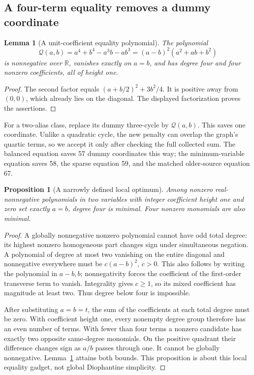 \documentclass[11pt,letterpaper]{article}
\newtheorem{lemma}[theorem]{Lemma}
\newtheorem{proposition}[theorem]{Proposition}
\theoremstyle{definition}\newtheorem{definition}[theorem]{Definition}
\theoremstyle{remark}\newtheorem{remark}[theorem]{Remark}
\newcommand{\Qeq}{\mathcal Q}
\begin{document}
\subsection{A four-term equality removes a dummy coordinate}

\begin{lemma}[A unit-coefficient equality polynomial]\label{lem:quarticpair}
The polynomial
\[
 \boxed{\Qeq(a,b)=a^4+b^4-a^3b-ab^3
             =(a-b)^2(a^2+ab+b^2)}
\]
is nonnegative over \(\mathbb R\), vanishes exactly on \(a=b\), and
has degree four and four nonzero coefficients, all of height one.
\end{lemma}
\begin{proof}
The second factor equals \((a+b/2)^2+3b^2/4\). It is positive away
from \((0,0)\), which already lies on the diagonal. The displayed
factorization proves the assertions.
\end{proof}

For a two-alias class, replace its dummy three-cycle by \(\Qeq(a,b)\).
This saves one coordinate. Unlike a quadratic cycle, the new penalty
can overlap the graph's quartic terms, so we accept it only after checking
the full collected sum. The balanced equation saves 57 dummy coordinates
this way; the minimum-variable equation saves 58, the sparse equation 59,
and the matched older-source equation 67.

\begin{proposition}[A narrowly defined local optimum]
Among nonzero real-nonnegative polynomials in two variables with integer
coefficient height one and zero set exactly \(a=b\), degree four is
minimal. Four nonzero monomials are also minimal.
\end{proposition}
\begin{proof}
A globally nonnegative nonzero polynomial cannot have odd total degree:
its highest nonzero homogeneous part changes sign under simultaneous
negation. A polynomial of degree at most two vanishing on the entire
diagonal and nonnegative everywhere must be \(c(a-b)^2\), \(c>0\).
This also follows by writing the polynomial in \(a-b,b\); nonnegativity
forces the coefficient of the first-order transverse term to vanish.
Integrality gives \(c\ge1\), so its mixed coefficient has magnitude at
least two. Thus degree below four is impossible.

After substituting \(a=b=t\), the sum of the coefficients at each
total degree must be zero. With coefficient height one, every nonempty
degree group therefore has an even number of terms. With fewer than
four terms a nonzero candidate has exactly two opposite same-degree
monomials. On the positive quadrant their difference changes sign as
\(a/b\) passes through one. It cannot be globally nonnegative.
Lemma~\ref{lem:quarticpair} attains both bounds. This proposition is
about this local equality gadget, not global Diophantine simplicity.
\end{proof}
\end{document}
